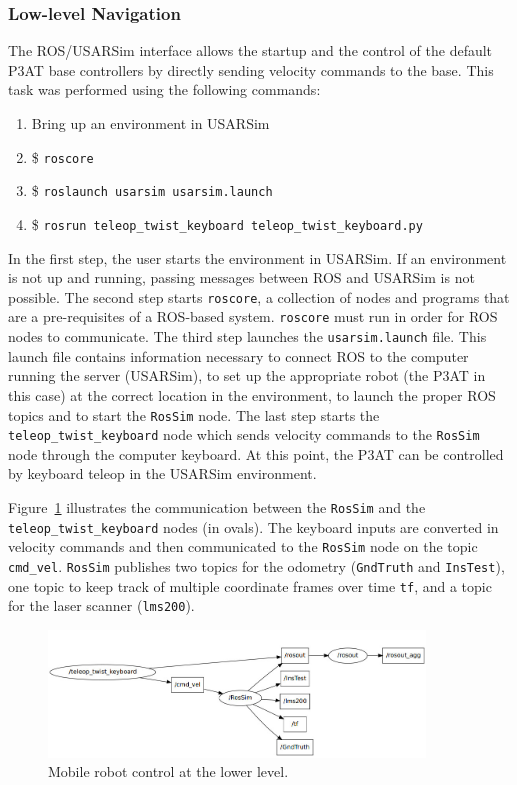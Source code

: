 \subsubsection*{Low-level Navigation}
The ROS/USARSim interface allows the startup and the control of the default P3AT base controllers by directly sending velocity commands to the base. This task was performed using the following commands:
\begin{enumerate}
\item Bring up an environment in USARSim
\item \$ \texttt{roscore}
\item \$ \texttt{roslaunch usarsim usarsim.launch}
\item \$ \texttt{rosrun teleop\_twist\_keyboard teleop\_twist\_keyboard.py}
\end{enumerate}

In the first step, the user starts the environment in USARSim. If an environment is not up and running, passing messages between ROS and USARSim is not possible. The second step starts \texttt{roscore}, a collection of nodes and programs that are a pre-requisites of a ROS-based system. \texttt{roscore} must run in order for ROS nodes to communicate. The third step launches the \texttt{usarsim.launch} file. This launch file contains information necessary to connect ROS to the computer running the server (USARSim), to set up the appropriate robot (the P3AT in this case) at the correct location in the environment, to launch the proper ROS topics and to start the \texttt{RosSim} node. The last step starts the \texttt{teleop\_twist\_keyboard} node which sends velocity commands to the \texttt{RosSim} node through the computer keyboard. At this point, the P3AT can be controlled by keyboard teleop in the USARSim environment.

Figure~\ref{fig:teleop} illustrates the communication between the \texttt{RosSim} and the \texttt{teleop\_twist\_keyboard} nodes (in ovals). The keyboard inputs are converted in velocity commands and then communicated to the \texttt{RosSim} node on the topic \texttt{cmd\_vel}. \texttt{RosSim} publishes two topics for the odometry (\texttt{GndTruth} and \texttt{InsTest}), one topic to keep track of multiple coordinate frames over time \texttt{tf}, and a topic for the laser scanner (\texttt{lms200}).
\begin{figure}[h!]
\centering
\includegraphics[width=10cm]{Figures/Misc/teleop-rossim-non-quiet.jpg}
\caption{Mobile robot control at the lower level.}\label{fig:teleop}
\end{figure}

